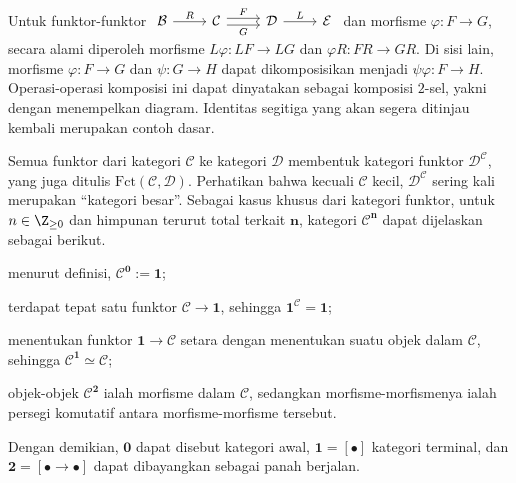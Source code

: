 Untuk funktor-funktor
$\begin{tikzcd}
	\mathcal{B} \arrow[r, "R"] & \mathcal{C} \arrow[shift left, r, "F"] \arrow[shift right, r, "G"'] & \mathcal{D} \arrow[r, "L"] & \mathcal{E}
\end{tikzcd}$
dan morfisme $\varphi: F \to G$, secara alami diperoleh morfisme
$L\varphi: LF \to LG$ dan $\varphi R: FR \to GR$. Di sisi lain, morfisme
$\varphi: F \to G$ dan $\psi: G \to H$ dapat dikomposisikan menjadi
$\psi\varphi: F \to H$. Operasi-operasi komposisi ini dapat dinyatakan sebagai
komposisi $2$-sel, yakni dengan menempelkan diagram. Identitas segitiga yang
akan segera ditinjau kembali merupakan contoh dasar.

Semua funktor dari kategori $\mathcal{C}$ ke kategori $\mathcal{D}$ membentuk
kategori funktor $\mathcal{D}^{\mathcal{C}}$, yang juga ditulis
$\mathrm{Fct}(\mathcal{C}, \mathcal{D})$. Perhatikan bahwa kecuali
	$\mathcal{C}$ kecil, $\mathcal{D}^{\mathcal{C}}$ sering kali merupakan
``kategori besar''. Sebagai kasus khusus dari kategori funktor, untuk
$n \in \Z_{\geq 0}$ dan himpunan terurut total terkait $\mathbf{n}$, kategori
$\mathcal{C}^{\mathbf{n}}$ dapat dijelaskan sebagai berikut.

\begin{compactitem}
	\item menurut definisi, $\mathcal{C}^{\mathbf{0}} := \mathbf{1}$;
	\item terdapat tepat satu funktor $\mathcal{C} \to \mathbf{1}$, sehingga
	$\mathbf{1}^{\mathcal{C}} = \mathbf{1}$;
	\item menentukan funktor $\mathbf{1} \to \mathcal{C}$ setara dengan
	menentukan suatu objek dalam $\mathcal{C}$, sehingga
	$\mathcal{C}^{\mathbf{1}} \simeq \mathcal{C}$;
	\item objek-objek $\mathcal{C}^{\mathbf{2}}$ ialah morfisme dalam
	$\mathcal{C}$, sedangkan morfisme-morfismenya ialah persegi komutatif
	antara morfisme-morfisme tersebut.
\end{compactitem}

Dengan demikian, $\mathbf{0}$ dapat disebut kategori awal,
$\mathbf{1} = [\bullet]$ kategori terminal, dan
$\mathbf{2} = [\bullet \to \bullet]$ dapat dibayangkan sebagai panah berjalan.

